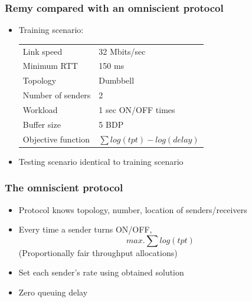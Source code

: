 \begin{frame}
\frametitle{Remy compared with an omniscient protocol}
\begin{itemize}
\item Training scenario:
\begin{tabular}{ll}
Link speed & 32 Mbits/sec \\
Minimum RTT & 150 ms \\
Topology & Dumbbell \\
Number of senders & 2 \\
Workload & 1 sec ON/OFF times \\
Buffer size & 5 BDP \\
Objective function & $\sum log(tpt) - log(delay)$
\end{tabular}
\item Testing scenario identical to training scenario
\end{itemize}
\end{frame}

\begin{frame}
\frametitle{The omniscient protocol}
\begin{itemize}
\item Protocol knows topology, number, location of senders/receivers  
\item Every time a sender turns ON/OFF,
      \begin{equation*}
      max. \sum log (tpt)
      \end{equation*}
      (Proportionally fair throughput allocations)
\item Set each sender's rate using obtained solution
\item Zero queuing delay
\end{itemize}
\end{frame}

